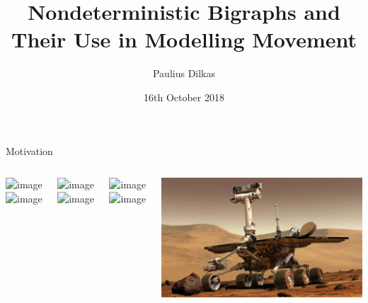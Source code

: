 \documentclass{beamer}
\author{Paulius Dilkas}
\title[Nondeterministic Bigraphs]{Nondeterministic Bigraphs and Their Use in
  Modelling Movement}
\institute[]{Formal Analysis, Theory and Algorithms}
\date{16th October 2018}
\begin{document}
\maketitle

\begin{frame}{Motivation}
  \begin{columns}[t]
    \centering
    \begin{overlayarea}{\textwidth}{0.5\textheight}
      \includegraphics<-2>[width=\textwidth]{uav.jpg}
      \includegraphics<3->[width=\textwidth]{drone.jpg}
    \end{overlayarea}
    \begin{overlayarea}{\textwidth}{0.5\textheight}
      \includegraphics<-3>[width=\textwidth]{underwater.jpg}
      \includegraphics<4->[width=\textwidth]{boat.png}
    \end{overlayarea}
    \centering
    \begin{overlayarea}{\textwidth}{0.5\textheight}
      \includegraphics<1>[width=\textwidth]{ground.jpg}
      \includegraphics<2->[width=\textwidth]{car.jpg}
    \end{overlayarea}
    \includegraphics[width=\textwidth]{rover.jpg}
  \end{columns}
\end{frame}
\end{document}

